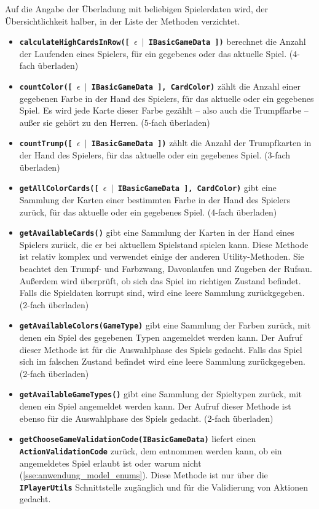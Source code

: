 \documentclass[
							a4paper, 
							11pt, 
							openany, 
							liststotoc,
							parskip=half, 
   							headings=normal
						]{scrreprt}
\begin{document}
{Auf die Angabe der Überladung mit beliebigen Spielerdaten wird, der Über\-sicht\-lich\-keit halber, in der Liste der Methoden verzichtet.
\begin{itemize}
	\item \textbf{\texttt{calculateHighCardsInRow([ $\epsilon$ $\mid$ IBasicGameData ])}} berechnet die Anzahl der Laufenden eines Spielers, für ein gegebenes oder das aktuelle Spiel. (4-fach über\-la\-den)
	\item \textbf{\texttt{countColor([ $\epsilon$ $\mid$ IBasicGameData ], CardColor)}} zählt die Anzahl einer gegebenen Farbe in der Hand des Spielers, für das aktuelle oder ein gegebenes Spiel. Es wird jede Karte dieser Farbe gezählt -- also auch die Trumpffarbe -- außer sie gehört zu den Herren. (5-fach überladen)
	\item \textbf{\texttt{countTrump([ $\epsilon$ $\mid$ IBasicGameData ])}} zählt die Anzahl der Trumpfkarten in der Hand des Spielers, für das aktuelle oder ein gegebenes Spiel. (3-fach überladen)
	\item \textbf{\texttt{getAllColorCards([ $\epsilon$ $\mid$ IBasicGameData ], CardColor)}} gibt eine Sammlung der Karten einer bestimmten Farbe in der Hand des Spielers zurück, für das aktuelle oder ein gegebenes Spiel. (4-fach überladen)
	\item \textbf{\texttt{getAvailableCards()}} gibt eine Sammlung der Karten in der Hand eines Spielers zurück, die er bei aktuellem Spielstand spielen kann. Diese Methode ist relativ komplex und verwendet einige der anderen Utility-Methoden. Sie beachtet den Trumpf- und Farbzwang, Davonlaufen und Zugeben der Rufsau. Außerdem wird überprüft, ob sich das Spiel im richtigen Zustand befindet. Falls die Spieldaten korrupt sind, wird eine leere Sammlung zurückgegeben. (2-fach überladen)
	\item \textbf{\texttt{getAvailableColors(GameType)}} gibt eine Sammlung der Farben zurück, mit denen ein Spiel des gegebenen Typen angemeldet werden kann. Der Aufruf dieser Methode ist für die Auswahlphase des Spiels gedacht. Falls das Spiel sich im falschen Zustand befindet wird eine leere Sammlung zurückgegeben. (2-fach überladen)
	\item \textbf{\texttt{getAvailableGameTypes()}} gibt eine Sammlung der Spieltypen zurück, mit denen ein Spiel angemeldet werden kann. Der Aufruf dieser Methode ist ebenso für die Auswahlphase des Spiels gedacht. (2-fach überladen)	
	\item \textbf{\texttt{getChooseGameValidationCode(IBasicGameData)}} liefert einen \textbf{\texttt{Action\-Va\-li\-da\-tion\-Code}} zurück, dem entnommen werden kann, ob ein angemeldetes Spiel erlaubt ist oder warum nicht (\autoref{sse:anwendung_model_enums}). Diese Methode ist nur über die \textbf{\texttt{IPlayer\-Utils}} Schnittstelle zugänglich und für die Validierung von Aktionen gedacht. 

\end{itemize}}
\end{document}
